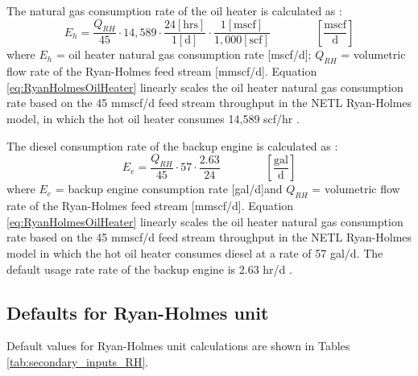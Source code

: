 \documentclass[11pt]{report}
\newcommand{\eqnunitfrac}[2]{\quad\quad \scriptstyle{\left[\frac{\text{#1}}{\text{#2}}\right]}}
\begin{document}
The natural gas consumption rate of the oil heater is calculated as \cite{NETLRyanHolmesModel}:
\begin{equation} \label{eq:RyanHolmesOilHeater}
E_{h}= \frac{Q_{RH}}{45} \cdot 14,589 \cdot \frac{24 [\text{hrs}]}{1 [\text{d}]} \cdot \frac{1 [\text{mscf}]}{1,000 [\text{scf}]} \quad\quad\eqnunitfrac{mscf}{d}
\end{equation}
where $E_{h}$ = oil heater natural gas consumption rate [mscf/d]; $Q_{RH}$ = volumetric flow rate of the Ryan-Holmes feed stream [mmscf/d]. Equation \ref{eq:RyanHolmesOilHeater} linearly scales the oil heater natural gas consumption rate based on the 45 mmscf/d feed stream throughput in the NETL Ryan-Holmes model, in which the hot oil heater consumes 14,589 scf/hr \cite{NETLRyanHolmesModel}. 

The diesel consumption rate of the backup engine is calculated as \cite{NETLRyanHolmesModel}:
\begin{equation} \label{eq:RyanHolmesBackupEngine}
E_{e}=\frac{Q_{RH}}{45}\cdot57\cdot\frac{2.63}{24} \quad\quad\eqnunitfrac{gal}{d}
\end{equation}
where $E_{e}$ = backup engine consumption rate [gal/d]and $Q_{RH}$ = volumetric flow rate of the Ryan-Holmes feed stream [mmscf/d]. Equation \ref{eq:RyanHolmesOilHeater} linearly scales the oil heater natural gas consumption rate based on the 45 mmscf/d feed stream throughput in the NETL Ryan-Holmes model in which the hot oil heater consumes diesel at a rate of 57 gal/d. The default usage rate rate of the backup engine is 2.63 hr/d  \cite{NETLRyanHolmesModel}. 

\subsection{Defaults for Ryan-Holmes unit}
Default values for Ryan-Holmes unit calculations are shown in Tables \ref{tab:secondary_inputs_RH}.

\end{document}
